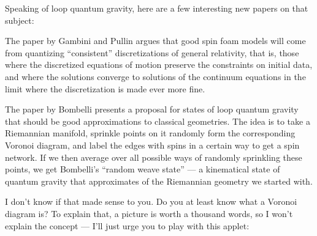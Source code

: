 \documentclass{article}
\def\tightlist{}
\renewcommand{\texttt}[1]{%
  \begingroup
  \ttfamily
  \begingroup\lccode`~=`/\lowercase{\endgroup\def~}{/\discretionary{}{}{}}%
  \begingroup\lccode`~=`[\lowercase{\endgroup\def~}{[\discretionary{}{}{}}%
  \begingroup\lccode`~=`.\lowercase{\endgroup\def~}{.\discretionary{}{}{}}%
  \catcode`/=\active\catcode`[=\active\catcode`.=\active
  \scantokens{#1\noexpand}%
  \endgroup
}
\begin{document}
Speaking of loop quantum gravity, here are a few interesting new papers
on that subject:


The paper by Gambini and Pullin argues that good spin foam models will
come from quantizing ``consistent'' discretizations of general
relativity, that is, those where the discretized equations of motion
preserve the constraints on initial data, and where the solutions
converge to solutions of the continuum equations in the limit where the
discretization is made ever more fine.

The paper by Bombelli presents a proposal for states of loop quantum
gravity that should be good approximations to classical geometries. The
idea is to take a Riemannian manifold, sprinkle points on it randomly
form the corresponding Voronoi diagram, and label the edges with spins
in a certain way to get a spin network. If we then average over all
possible ways of randomly sprinkling these points, we get Bombelli's
``random weave state'' --- a kinematical state of quantum gravity that
approximates of the Riemannian geometry we started with.

I don't know if that made sense to you. Do you at least know what a
Voronoi diagram is? To explain that, a picture is worth a thousand
words, so I won't explain the concept --- I'll just urge you to play
with this applet:

\end{document}
